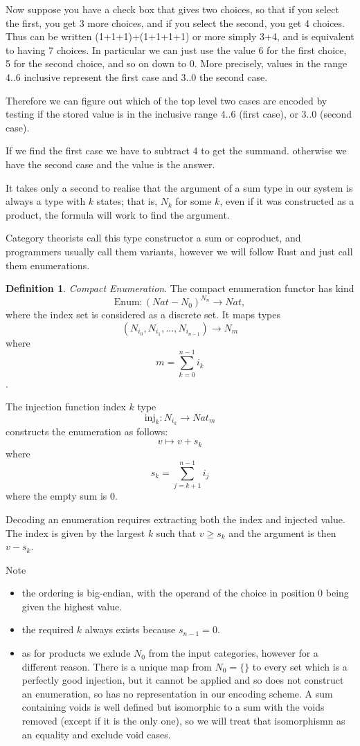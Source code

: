 \documentclass[oneside]{book}
\theoremstyle{plain}
\theoremstyle{definition}
\newtheorem{definition}{Definition}
\theoremstyle{plain}
\def\Nat{\mathit{Nat}}
\begin{document}
Now suppose you have a check box that gives two choices, so that if you select
the first, you get 3 more choices, and if you select the second, you get 4 choices.
Thus can be written (1+1+1)+(1+1+1+1) or more simply 3+4, and is equivalent
to having 7 choices. In particular we can just use the value 6 for the first choice,
5 for the second choice, and so on down to 0. More precisely, values in the range
4..6 inclusive represent the first case and 3..0 the second case.

Therefore we can figure out which of the top level two cases are encoded
by testing if the stored value is in the inclusive range 4..6 (first case),
or 3..0 (second case).

If we find the first case we have to subtract 4 to get the summand.
otherwise we have the second case and the value is the answer.

It takes only a second to realise that the argument of a sum type
in our system is always a type with $k$ states; that is, $N_k$
for some $k$, even if it was constructed as a product, the formula
will work to find the argument.

Category theorists call this type constructor a sum or coproduct,
and programmers usually call them variants, however we will
follow Rust and just call them enumerations.

\begin{definition} {\em Compact Enumeration}.
The compact enumeration functor has kind 
$$\mathrm{Enum}: (Nat-N_0)^{\mathit{N_n}}\rightarrow \Nat,$$
where the index set is considered as a discrete set.
It maps types
$$(\mathit{N}_{i_0}, \mathit{N}_{i_1}, ... , \mathit{N_{i_{n-1}}}) \rightarrow \mathit{N}_m$$
where 
$$m=\sum_{k=0}^{n-1}i_k$$. 

The injection function index $k$ type $$\mathrm{inj}_k : N_{i_k} \rightarrow \Nat_m$$
constructs the enumeration as follows: 
$$v\mapsto v + s_k$$
where
$$s_k = \sum_{j=k+1}^{n-1}i_j$$
where the empty sum is 0.

Decoding an enumeration requires extracting both the index and injected
value. The index is given by the largest $k$ such 
that $v \geq s_k$ and the argument is then $v - s_k$. 
\end{definition}

Note
\begin{itemize}
\item
the ordering is big-endian, with the operand of the choice 
in position 0 being given the highest value.

\item
the required $k$ always exists because $s_{n-1}=0$.

\item
as for products we exlude $N_0$ from the input categories,
however for a different reason. There is a unique map from $N_0=\{\}$ 
to every set which is a perfectly good injection, but it cannot
be applied and so does not construct an enumeration, so has
no representation in our encoding scheme. A sum containing voids
is well defined but isomorphic to a sum with the voids removed
(except if it is the only one), so we will treat that isomorphismn
as an equality and exclude void cases.
\end{itemize}
\end{document}
